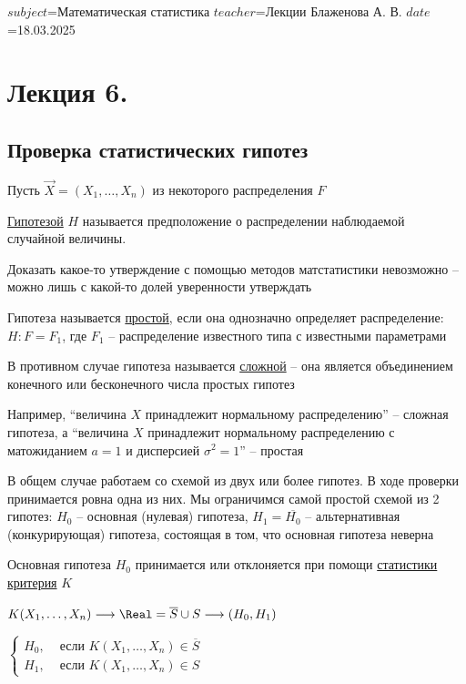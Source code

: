 $subject$=Математическая статистика
$teacher$=Лекции Блаженова А. В.
$date$=18.03.2025

\section{Лекция 6.}

\subsection{Проверка статистических гипотез}

\hypertarget{hypothesis}{}

Пусть $\vec X = (X_1, \dots, X_n)$ из некоторого распределения $F$

\Def \underline{Гипотезой} $H$ называется предположение о распределении наблюдаемой случайной величины. 

Доказать какое-то утверждение с помощью методов матстатистики невозможно -- можно лишь с какой-то долей 
уверенности утверждать

\Def Гипотеза называется \underline{простой}, если она однозначно определяет распределение: 
$H : F = F_1$, где $F_1$ -- распределение известного типа с известными параметрами

В противном случае гипотеза называется \underline{сложной} -- она является объединением конечного или бесконечного числа
простых гипотез

Например, \enquote{величина $X$ принадлежит нормальному распределению} -- сложная гипотеза, а 
\enquote{величина $X$ принадлежит нормальному распределению с матожиданием $a = 1$ и дисперсией $\sigma^2 = 1$} -- простая


В общем случае работаем со схемой из двух или более гипотез. В ходе проверки принимается ровна одна из них.
Мы ограничимся самой простой схемой из 2 гипотез: $H_0$ -- основная (нулевая) гипотеза, $H_1 = \overline{H_0}$ -- 
альтернативная (конкурирующая) гипотеза, состоящая в том, что основная гипотеза неверна

Основная гипотеза $H_0$ принимается или отклоняется при помощи \underline{статистики критерия} $K$ 

$K(X_1, \dots, X_n) \longrightarrow \Real = \overline{S} \cup S \longrightarrow (H_0, H_1)$

$\begin{cases}
    H_0, & \text{ если } K(X_1, \dots, X_n) \in \overline{S} \\
    H_1, & \text{ если } K(X_1, \dots, X_n) \in S
\end{cases}$

